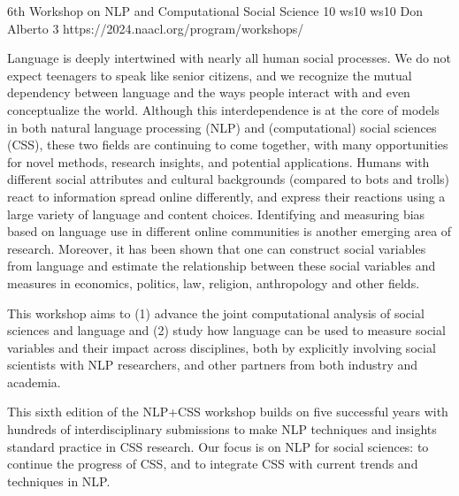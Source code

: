 \begin{wsschedulenolist}
{6th Workshop on NLP and Computational Social Science}
{10}
{ws10}
{ws10}
{Don Alberto 3}
{https://2024.naacl.org/program/workshops/}

Language is deeply intertwined with nearly all human social processes. We do not expect teenagers to speak like senior citizens, and we recognize the mutual dependency between language and the ways people interact with and even conceptualize the world. Although this interdependence is at the core of models in both natural language processing (NLP) and (computational) social sciences (CSS), these two fields are continuing to come together, with many opportunities for novel methods, research insights, and potential applications. Humans with different social attributes and cultural backgrounds (compared to bots and trolls) react to information spread online differently, and express their reactions using a large variety of language and content choices. Identifying and measuring bias based on language use in different online communities is another emerging area of research. Moreover, it has been shown that one can construct social variables from language and estimate the relationship between these social variables and measures in economics, politics, law, religion, anthropology and other fields.

This workshop aims to (1) advance the joint computational analysis of social sciences and language and (2) study how language can be used to measure social variables and their impact across disciplines, both by explicitly involving social scientists with NLP researchers, and other partners from both industry and academia.

This sixth edition of the NLP+CSS workshop builds on five successful years with hundreds of interdisciplinary submissions to make NLP techniques and insights standard practice in CSS research. Our focus is on NLP for social sciences: to continue the progress of CSS, and to integrate CSS with current trends and techniques in NLP.

\end{wsschedulenolist}
